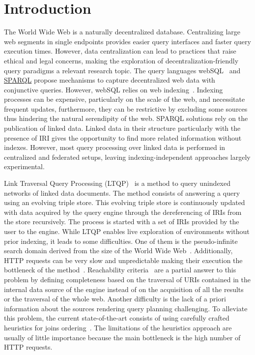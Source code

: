 \section{Introduction}


The World Wide Web is a naturally decentralized database.
Centralizing large web segments in single endpoints provides easier query interfaces and faster query execution times.
However, data centralization can lead to practices that raise ethical and legal concerns, making the exploration of decentralization-friendly query paradigms a relevant research topic.
The query languages webSQL~\cite{Mendelzon1996} and \href{https://www.w3.org/TR/sparql11-query/}{SPARQL} propose mechanisms to capture decentralized web data with conjunctive queries.
However, webSQL relies on web indexing~\cite{Mendelzon1996}.
Indexing processes can be expensive, particularly on the scale of the web, and necessitate frequent updates, furthermore, they can be restrictive by excluding some sources thus hindering the natural serendipity of the web.
SPARQL solutions rely on the publication of linked data.
Linked data in their structure particularly with the presence of IRI gives the opportunity to find more related information without indexes.
However, most query processing over linked data is performed in centralized and federated setups, leaving indexing-independent approaches largely experimental.

Link Traversal Query Processing (LTQP)~\cite{Hartig2012} is a method to query unindexed networks of linked data documents.
The method consists of answering a query using an evolving triple store.
This evolving triple store is continuously updated with data acquired by the query engine through the dereferencing of IRIs from the store recursively.
The process is started with a set of IRIs provided by the user to the engine.
While LTQP enables live exploration of environments without prior indexing, it leads to some difficulties.
One of them is the pseudo-infinite search domain derived from the size of the World Wide Web~\cite{hartig2016walking}.
Additionally, HTTP requests can be very slow and unpredictable making their execution the bottleneck of the method~\cite{hartig2016walking}.
Reachability criteria~\cite{Hartig2012} are a partial answer to this problem by defining completeness based on the traversal of URIs
contained in the internal data source of the engine instead of on the acquisition of all the results or the traversal of the whole web.
Another difficulty is the lack of a priori information about the sources rendering query planning challenging.
To alleviate this problem, the current state-of-the-art consists of using carefully crafted heuristics for joins ordering~\cite{Hartig2011}.
The limitations of the heuristics approach are usually of little importance because the main bottleneck is the high number of HTTP requests.

